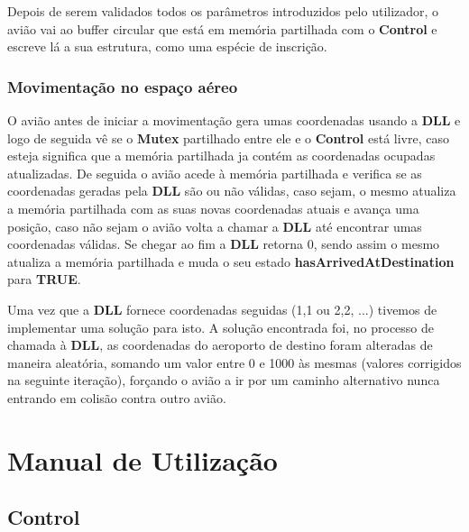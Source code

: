 \documentclass[11pt]{article}
\begin{document}
	Depois de serem validados todos os parâmetros introduzidos pelo utilizador, o avião vai ao buffer circular que está em memória partilhada com o \textbf{Control} e escreve lá a sua estrutura, como uma espécie de inscrição.
	
	
	\large
	\subsubsection{Movimentação no  espaço  aéreo}
	\normalsize
	
	O avião antes de iniciar a movimentação gera umas coordenadas usando a \textbf{DLL} e logo de seguida vê se o \textbf{Mutex} partilhado entre ele e o \textbf{Control} está livre, caso esteja significa que a memória partilhada ja contém as coordenadas ocupadas atualizadas. De seguida o avião acede à memória partilhada e verifica se as coordenadas geradas pela \textbf{DLL} são ou não válidas, caso sejam, o mesmo atualiza a memória partilhada com as suas novas coordenadas atuais e avança uma posição, caso não sejam o avião volta a chamar a \textbf{DLL} até encontrar umas coordenadas válidas. Se chegar ao fim a \textbf{DLL} retorna 0, sendo assim o mesmo atualiza a memória partilhada e muda o seu estado \textbf{hasArrivedAtDestination} para \textbf{TRUE}.
	
	Uma vez que a \textbf{DLL} fornece coordenadas seguidas (1,1 ou 2,2, ...) tivemos de implementar uma solução para isto. A solução encontrada foi, no processo de chamada à \textbf{DLL}, as coordenadas do aeroporto de destino foram alteradas de maneira aleatória, somando um valor entre 0 e 1000 às mesmas (valores corrigidos na seguinte iteração), forçando o avião a ir por um caminho alternativo nunca entrando em colisão contra outro avião.


	\large
	\section{Manual de Utilização}
	\subsection{Control}
	\normalsize
	
\end{document}
